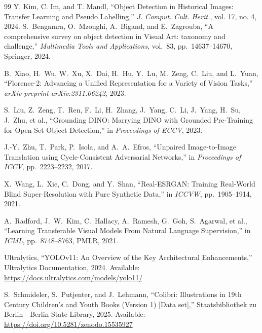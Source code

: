 \documentclass[aspectratio=169, 10pt]{beamer}
\begin{document}
\begin{thebibliography}{99}
Y. Kim, C. Im, and T. Mandl,
\newblock ``Object Detection in Historical Images: Transfer Learning and Pseudo Labelling,''
\newblock \emph{J. Comput. Cult. Herit.}, vol. 17, no. 4, 2024.
  S.~Bengamra, O.~Mzoughi, A.~Bigand, and E.~Zagrouba, ``A comprehensive survey on object detection in Visual Art: taxonomy and challenge,'' \emph{Multimedia Tools and Applications}, vol.~83, pp.~14637--14670, Springer, 2024.

  B.~Xiao, H.~Wu, W.~Xu, X.~Dai, H.~Hu, Y.~Lu, M.~Zeng, C.~Liu, and L.~Yuan, ``Florence-2: Advancing a Unified Representation for a Variety of Vision Tasks,'' \emph{arXiv preprint arXiv:2311.06242}, 2023.

  S.~Liu, Z.~Zeng, T.~Ren, F.~Li, H.~Zhang, J.~Yang, C.~Li, J.~Yang, H.~Su, J.~Zhu, et al., ``Grounding DINO: Marrying DINO with Grounded Pre-Training for Open-Set Object Detection,'' in \emph{Proceedings of ECCV}, 2023.

  J.-Y.~Zhu, T.~Park, P.~Isola, and A.~A.~Efros, ``Unpaired Image-to-Image Translation using Cycle-Consistent Adversarial Networks,'' in \emph{Proceedings of ICCV}, pp.~2223--2232, 2017.

  X.~Wang, L.~Xie, C.~Dong, and Y.~Shan, ``Real-ESRGAN: Training Real-World Blind Super-Resolution with Pure Synthetic Data,'' in \emph{ICCVW}, pp.~1905--1914, 2021.

  A.~Radford, J.~W.~Kim, C.~Hallacy, A.~Ramesh, G.~Goh, S.~Agarwal, et al., ``Learning Transferable Visual Models From Natural Language Supervision,'' in \emph{ICML}, pp.~8748--8763, PMLR, 2021.

  Ultralytics, ``YOLOv11: An Overview of the Key Architectural Enhancements,'' Ultralytics Documentation, 2024. Available: \url{https://docs.ultralytics.com/models/yolo11/}

  S.~Schmideler, S.~Putjenter, and J.~Lehmann, ``Colibri: Illustrations in 19th Century Children's and Youth Books (Version 1) [Data set],'' Staatsbibliothek zu Berlin - Berlin State Library, 2025. Available: \url{https://doi.org/10.5281/zenodo.15535927}
\end{thebibliography}
\end{document}
